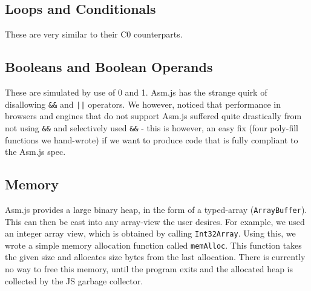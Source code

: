 \documentclass[twoside]{article}
\begin{document}
\begin{multicols}{2}
  \subsection{Loops and Conditionals}
    These are very similar to their C0 counterparts.

  \subsection{Booleans and Boolean Operands}
    These are simulated by use of 0 and 1. Asm.js has the strange quirk of disallowing 
    \texttt{\&\&} and \texttt{||} operators. We however, noticed that performance in browsers
    and engines that do not support Asm.js suffered quite drastically from not using \texttt{\&\&}
    and selectively used \texttt{\&\&} - this is however, an easy fix (four poly-fill functions we
    hand-wrote) if we want to produce code that is fully compliant to the Asm.js spec. 

  \subsection{Memory}
    Asm.js provides a large binary heap, in the form of a typed-array (\texttt{ArrayBuffer}). 
    This can then be cast into any array-view the user desires. For example, we used an integer array view,
    which is obtained by calling \verb+Int32Array+. Using this, we
    wrote a simple memory allocation function called \texttt{memAlloc}. This function takes the given
    size and allocates size bytes from the last allocation. There is currently no way to
    free this memory, until the program exits and the allocated heap is collected by the JS 
    garbage collector. 


\end{multicols}
\end{document}
